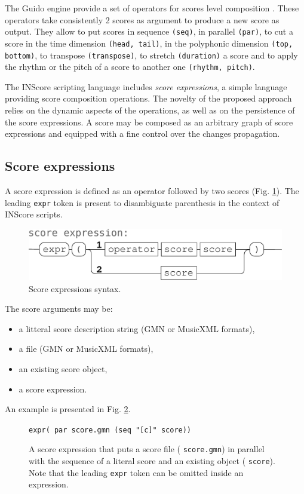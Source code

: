 \documentclass[11pt,a4paper]{article}
\newcommand{\OSC}[1]	{{\fontsize{10pt}{10pt} \selectfont\texttt{#1}}}
\newcommand{\sample}[1]	{\vspace{-0.2em}\begin{center}\colorbox{mygrey}{\begin{minipage}[t]{0.98\columnwidth} {\small \texttt{#1}}\end{minipage}}\end{center}}
\begin{document}
The Guido engine provide a set of operators for scores level composition \cite{fober12b}. These operators take consistently 2 scores as argument to produce a new score as output. They allow to put scores in sequence \OSC{(seq)}, in parallel \OSC{(par)}, to cut a score in the time dimension \OSC{(head, tail)}, in the polyphonic dimension \OSC{(top, bottom)}, to transpose \OSC{(transpose)}, to stretch \OSC{(duration)} a score and to apply the rhythm or the pitch of a score to another one \OSC{(rhythm, pitch)}.

The INScore scripting language includes \emph{score expressions}, a simple language providing score composition operations. 
The novelty of the proposed approach relies on the dynamic aspects of the operations, as well as on the persistence of the score expressions. A score may be composed as an arbitrary graph of score expressions and equipped with a fine control over the changes propagation.

\subsection{Score expressions}

A score expression is defined as an operator followed by two scores (Fig. \ref{fig:scexpr}). The leading \OSC{expr} token is present to disambiguate parenthesis in the context of INScore scripts.
\begin{figure}[ht]
\begin{center}
	\includegraphics[width=1.\columnwidth]{imgs/score-expr}
\caption{Score expressions syntax.}
\label{fig:scexpr}
\end{center}
\end{figure}

The score arguments may be:
\begin{itemize}
\item a litteral score description string (GMN or MusicXML formats),
\item a file (GMN or MusicXML formats),
\item an existing score object,
\item a score expression.
\end{itemize}
An example is presented in Fig. \ref{fig:scex1}.
\begin{figure}[ht]
\begin{center}
\sample{expr( par score.gmn (seq "[c]" score))
}
\caption{A score expression that puts a score file (\OSC{score.gmn}) in parallel with the sequence of a literal score and an existing object (\OSC{score}). Note that the leading \OSC{expr} token can be omitted inside an expression.}
\label{fig:scex1}
\end{center}
\end{figure}
\end{document}
